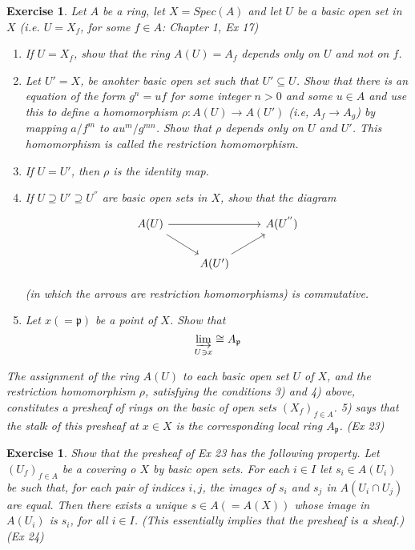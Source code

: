 \documentclass[]{report}
\newtheorem{exercise}[theorem]{Exercise}
\begin{document}
\begin{exercise}
    Let $A$ be a ring, let $X = Spec(A)$ and let $U$ be a basic open set in $X$ (i.e. $U=X_f$, for some $f\in A$: Chapter 1, Ex 17)
    \begin{enumerate}
        \item If $U=X_f$, show that the ring $A(U) = A_f$ depends only on $U$ and not on $f$.
        \item Let $U' = X$, be anohter basic open set such that $U'\subseteq U$. Show that there is an equation of the form $g^{n} = uf$ for some integer $n>0$ and some $u\in A$ and use this to define a homomorphism $\rho: A(U)\rightarrow A(U')$ (i.e, $A_f\rightarrow A_g$) by mapping $a/f^m$ to $au^m/g^{mn}$. Show that $\rho$ depends only on $U$ and $U'$. This homomorphism is called the restriction homomorphism.
        \item If $U = U'$, then $\rho$ is the identity map.
        \item If $U \supseteq U' \supseteq U^{''}$ are basic open sets in $X$, show that the diagram
        $$\begin{tikzcd}
                A(U) \arrow[rr] \arrow[rd] &  & A(U^{''}) \\
                & A(U') \arrow[ru] &          
            \end{tikzcd}$$

            (in which the arrows are restriction homomorphisms) is commutative.
        \item Let $x (=\mathfrak{p})$ be a point of $X$. Show that
            $$\varinjlim_{U\ni x} \cong A_\mathfrak{p}$$
    \end{enumerate}

    The assignment of the ring $A(U)$ to each basic open set $U$ of $X$, and the restriction homomorphism $\rho$, satisfying the conditions 3) and 4) above, constitutes a presheaf of rings on the basic of open sets $(X_f)_{f\in A}$. 5) says that the stalk of this presheaf at $x\in X$ is the corresponding local ring $A_\mathfrak{p}$. 
    (Ex 23)
\end{exercise}

\begin{exercise}
    Show that the presheaf of Ex 23 has the following property. Let $(U_f)_{f\in A}$ be a covering o $X$ by basic open sets. For each $i\in I$ let $s_i\in A(U_i)$ be such that, for each pair of indices $i,j$, the images of $s_i$ and $s_j$ in $A(U_i\cap U_j)$ are equal. Then there exists a unique $s\in A(=A(X))$ whose image in $A(U_i)$ is $s_i$, for all $i\in I$. (This essentially implies that the presheaf is a sheaf.)
    (Ex 24)
\end{exercise}
\end{document}
